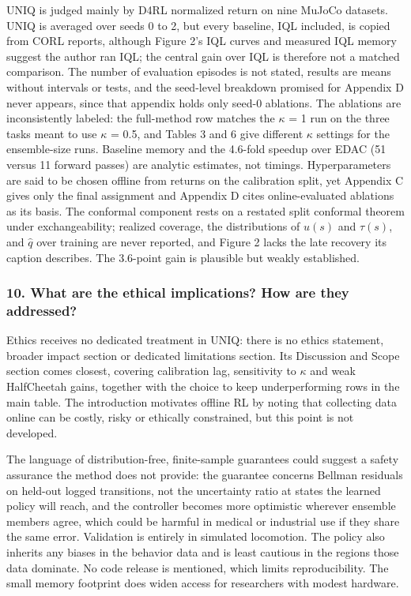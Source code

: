 \documentclass[11pt]{article}
\newcommand{\question}[1]{\subsubsection*{#1}}
\begin{document}
UNIQ is judged mainly by D4RL normalized return on nine MuJoCo datasets. UNIQ is averaged over seeds 0 to 2, but every baseline, IQL included, is copied from CORL reports, although Figure 2's IQL curves and measured IQL memory suggest the author ran IQL; the central gain over IQL is therefore not a matched comparison. The number of evaluation episodes is not stated, results are means without intervals or tests, and the seed-level breakdown promised for Appendix D never appears, since that appendix holds only seed-0 ablations. The ablations are inconsistently labeled: the full-method row matches the \ensuremath{\kappa} = 1 run on the three tasks meant to use \ensuremath{\kappa} = 0.5, and Tables 3 and 6 give different \ensuremath{\kappa} settings for the ensemble-size runs. Baseline memory and the 4.6-fold speedup over EDAC (51 versus 11 forward passes) are analytic estimates, not timings. Hyperparameters are said to be chosen offline from returns on the calibration split, yet Appendix C gives only the final assignment and Appendix D cites online-evaluated ablations as its basis. The conformal component rests on a restated split conformal theorem under exchangeability; realized coverage, the distributions of $u(s)$ and $\tau(s)$, and $\hat{q}$ over training are never reported, and Figure 2 lacks the late recovery its caption describes. The 3.6-point gain is plausible but weakly established.

\question{10. What are the ethical implications? How are they addressed?}

Ethics receives no dedicated treatment in UNIQ: there is no ethics statement, broader impact section or dedicated limitations section. Its Discussion and Scope section comes closest, covering calibration lag, sensitivity to \ensuremath{\kappa} and weak HalfCheetah gains, together with the choice to keep underperforming rows in the main table. The introduction motivates offline RL by noting that collecting data online can be costly, risky or ethically constrained, but this point is not developed.

The language of distribution-free, finite-sample guarantees could suggest a safety assurance the method does not provide: the guarantee concerns Bellman residuals on held-out logged transitions, not the uncertainty ratio at states the learned policy will reach, and the controller becomes more optimistic wherever ensemble members agree, which could be harmful in medical or industrial use if they share the same error. Validation is entirely in simulated locomotion. The policy also inherits any biases in the behavior data and is least cautious in the regions those data dominate. No code release is mentioned, which limits reproducibility. The small memory footprint does widen access for researchers with modest hardware.
\end{document}
